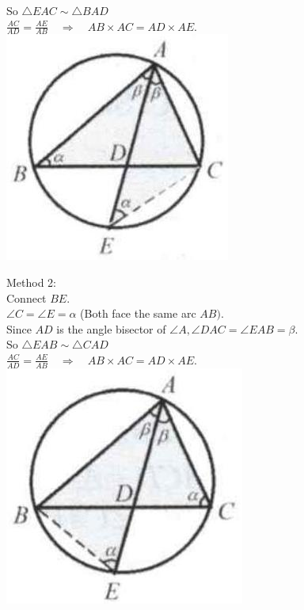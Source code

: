 \documentclass{article}
\begin{document}
So \(\triangle E A C \sim \triangle B A D\)\\
\(\frac{A C}{A D}=\frac{A E}{A B} \quad \Rightarrow \quad A B \times A C=A D \times A E\).\\
\centering
\includegraphics[width=\textwidth]{images/165.jpg}

Method 2:\\
Connect \(B E\).\\
\(\angle C=\angle E=\alpha\) (Both face the same arc \(A B)\).\\
Since \(A D\) is the angle bisector of \(\angle A, \angle D A C=\angle E A B=\beta\).\\
So \(\triangle E A B \sim \triangle C A D\)\\
\(\frac{A C}{A D}=\frac{A E}{A B} \quad \Rightarrow \quad A B \times A C=A D \times A E\).\\
\centering
\includegraphics[width=\textwidth]{images/165(3).jpg}
\end{document}
